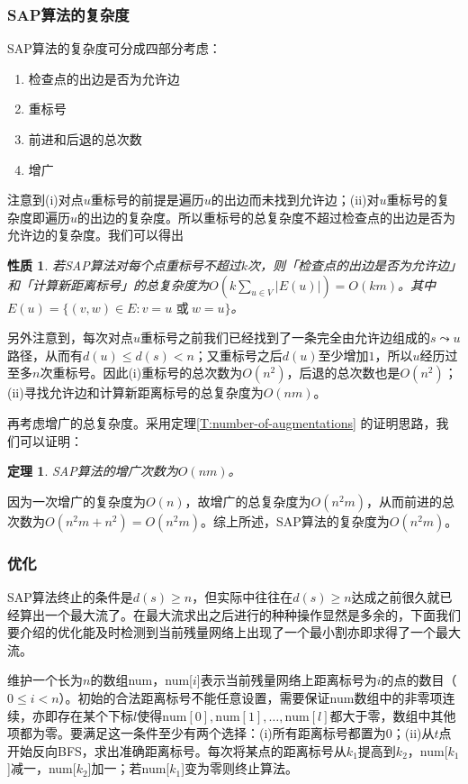 \documentclass[a4paper]{ctexbook}
\newtheorem{theorem}{定理}[chapter] %
\newtheorem{property}{性质}[chapter]
\begin{document}
  \subsubsection{SAP算法的复杂度}
  SAP算法的复杂度可分成四部分考虑：
  \begin{enumerate}
    \item 检查点的出边是否为允许边
    \item 重标号
    \item 前进和后退的总次数
    \item 增广
  \end{enumerate}

  注意到(i)对点$u$重标号的前提是遍历$u$的出边而未找到允许边；(ii)对$u$重标号的复杂度即遍历$u$的出边的复杂度。所以重标号的总复杂度不超过检查点的出边是否为允许边的复杂度。我们可以得出
  \begin{property}
    若SAP算法对每个点重标号不超过$k$次，则「检查点的出边是否为允许边」和「计算新距离标号」的总复杂度为$O(k\sum\limits_{u\in V}|E(u)|)=O(km)$。其中$E(u)=\{(v,w)\in E\colon v= u \text{ 或}\ w = u\}$。
  \end{property}
  另外注意到，每次对点$u$重标号之前我们已经找到了一条完全由允许边组成的$s\leadsto u$路径，从而有$d(u)\le d(s)< n$；又重标号之后$d(u)$至少增加$1$，所以$u$经历过至多$n$次重标号。因此(i)重标号的总次数为$O(n^2)$，后退的总次数也是$O(n^2)$；(ii)寻找允许边和计算新距离标号的总复杂度为$O(nm)$。

  再考虑增广的总复杂度。采用定理\ref{T:number-of-augmentations} 的证明思路，我们可以证明：
  \begin{theorem}
    SAP算法的增广次数为$O(nm)$。
  \end{theorem}
  因为一次增广的复杂度为$O(n)$，故增广的总复杂度为$O(n^2m)$，从而前进的总次数为$O(n^2m+n^2)=O(n^2m)$。综上所述，SAP算法的复杂度为$O(n^2m)$。
  \subsubsection{优化}
  SAP算法终止的条件是$d(s)\ge n$，但实际中往往在$d(s)\ge n$达成之前很久就已经算出一个最大流了。在最大流求出之后进行的种种操作显然是多余的，下面我们要介绍的优化能及时检测到当前残量网络上出现了一个最小割亦即求得了一个最大流。

  维护一个长为$n$的数组num，num[$i$]表示当前残量网络上距离标号为$i$的点的数目（$0\le i < n$）。初始的合法距离标号不能任意设置，需要保证num数组中的非零项连续，亦即存在某个下标$l$使得$\mathrm{num}[0],\mathrm{num}[1],\dots,\mathrm{num}[l]$都大于零，数组中其他项都为零。要满足这一条件至少有两个选择：(i)所有距离标号都置为$0$；(ii)从$t$点开始反向BFS，求出准确距离标号。每次将某点的距离标号从$k_1$提高到$k_2$，num[$k_1$]减一，num[$k_2$]加一；若num[$k_1$]变为零则终止算法。
\end{document}
